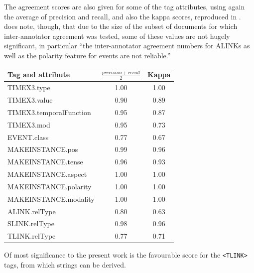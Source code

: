 \documentclass[a4paper,12pt,leqno]{article}
\begin{document}
The agreement scores are also given for some of the tag attributes, using again the average of precision and recall, and also the kappa scores, reproduced in . \citet{timeml2005timeml} does note, though, that due to the size of the subset of documents for which inter-annotator agreement was tested, some of these values are not hugely significant, in particular ``the inter-annotator
agreement numbers for ALINKs as well as the polarity feature for events are not reliable.''
\begin{center}
	\begin{tabular}[]{|l c c|}
		\hline
		\textbf{Tag and attribute} & \textbf{$\frac{precision+recall}{2}$} & \textbf{Kappa}\\
		\hline
		TIMEX3.type & 1.00 & 1.00\\
		TIMEX3.value & 0.90 & 0.89\\
		TIMEX3.temporalFunction & 0.95 & 0.87\\
		TIMEX3.mod & 0.95 & 0.73\\
		EVENT.class & 0.77 & 0.67\\
		MAKEINSTANCE.pos & 0.99 & 0.96\\
		MAKEINSTANCE.tense & 0.96 & 0.93\\
		MAKEINSTANCE.aspect & 1.00 & 1.00\\
		MAKEINSTANCE.polarity & 1.00 & 1.00\\
		MAKEINSTANCE.modality & 1.00 & 1.00\\
		ALINK.relType & 0.80 & 0.63\\
		SLINK.relType & 0.98 & 0.96\\
		TLINK.relType & 0.77 & 0.71\\
		\hline
	\end{tabular}
	\label{fig:inter-annotator-timebank-attrs}
\end{center}
Of most significance to the present work is the favourable score for the \verb|<TLINK>| tags, from which strings can be derived.
\end{document}
